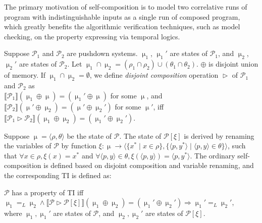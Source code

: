 \documentclass{llncs}
\begin{document}
The primary motivation of self-composition is to model two
correlative runs of program with indistinguishable inputs as a
single run of composed program, which greatly benefits the
algorithmic verification techniques, such as model checking, on the
property expressing via temporal logics.

Suppose $\mathcal {P}_1$ and $\mathcal {P}_2$ are pushdown systems.
$\upmu_1$, $\upmu_1'$ are states of $\mathcal {P}_1$, and $\upmu_2$,
$\upmu_2'$ are states of $\mathcal {P}_2$. Let $\upmu_1 \cap
\upmu_2=(\rho_1 \cap \rho_2)\cup (\theta_1 \cap \theta_2)$. $\oplus$
is disjoint union of memory. If $\upmu_1\cap \upmu_2=\emptyset$, we
define \emph{disjoint composition} operation $\vartriangleright$ of
$\mathcal {P}_1$ and
$\mathcal {P}_2$ as\\
$\llbracket \mathcal {P}_1\rrbracket(\upmu_1\oplus
\upmu)=(\upmu_1'\oplus \upmu)$ for some $\upmu$, and $\llbracket
\mathcal {P}_2\rrbracket(\upmu'\oplus \upmu_2)=(\upmu'\oplus
\upmu_2')$ for some $\upmu'$, iff $\llbracket \mathcal
{P}_1\vartriangleright \mathcal {P}_2\rrbracket (\upmu_1\oplus
\upmu_2)=(\upmu_1'\oplus \upmu_2')$.

Suppose $\upmu=\langle \rho,\theta\rangle $ be the state of
$\mathcal {P}$. The state of $\mathcal{P}[\xi]$ is derived by
renaming the variables of $\mathcal{P}$ by function
$\xi:\upmu\rightarrow \langle \{x^* \mid x\in \rho\},\{\langle
p,y^*\rangle \mid \langle p,y\rangle \in \theta\}\rangle $, such
that $\forall x\in \rho, \xi(x)=x^*$ and $\forall \langle p,y\rangle
\in \theta, \xi(\langle p,y\rangle )=\langle p,y^*\rangle $. The
ordinary self-composition is defined based on disjoint composition
and variable renaming, and the corresponding TI is defined as:
\begin{definition}
$\mathcal {P}$ has a property of TI iff\\
\hspace*{\fill}$\upmu_1 =_L \upmu_2 \wedge \llbracket
\mathcal{P}\vartriangleright \mathcal{P}[\xi]\rrbracket(\upmu_1
\oplus \upmu_2)=(\upmu_1' \oplus
\upmu_2')\Rightarrow  \upmu_1' =_L \upmu_2'$,\hspace*{\fill}\\
where $\upmu_1,\upmu_1'$ are states of $\mathcal {P}$, and
$\upmu_2,\upmu_2'$ are states of $\mathcal {P}[\xi]$.
\end{definition}
\end{document}
